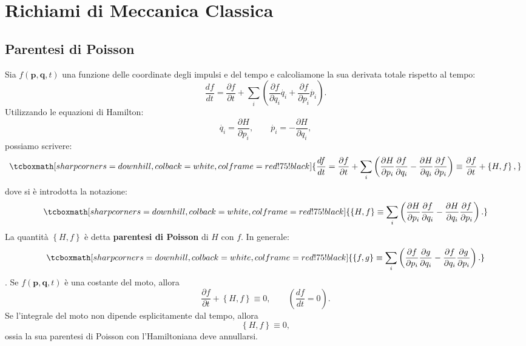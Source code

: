 \chapter{Richiami di Meccanica Classica}
\section[Parentesi di Poisson]{Parentesi di Poisson}
Sia $f(\mathbf{p},\mathbf{q},t)$ una funzione delle coordinate degli impulsi e del tempo e calcoliamone la sua derivata totale rispetto al tempo:
	\begin{equation}
		\frac{df}{dt}= \frac{\partial f}{\partial t} + \sum_i \left( \frac{\partial f}{\partial q_i} \dot {q_i} + \frac{\partial f}{\partial p_i} \dot {p_i} \right).
	\end{equation}
Utilizzando le equazioni di Hamilton:
	\begin{equation}
		\dot{q_i}=\frac{\partial H}{\partial p_i} , \qquad \dot{p_i}=-\frac{\partial H}{\partial q_i} ,
	\end{equation}
possiamo scrivere:
	\begin{equation}
		\tcboxmath[sharp corners=downhill ,colback=white,colframe=red!75!black]{
			\frac{df}{dt}=	\frac{\partial f}{\partial t} + \sum_i \left( \frac{\partial H}{\partial p_i}\frac{\partial f}{\partial q_i}-\frac{\partial H}{\partial q_i}\frac{\partial f}{\partial p_i}\right) \equiv \frac{\partial f}{\partial t} + \left\lbrace H,f \right\rbrace ,
				}
	\end{equation}
dove si \`e introdotta la notazione:
	\begin{equation}
		\tcboxmath[sharp corners=downhill ,colback=white,colframe=red!75!black]{
			\left\lbrace H,f \right\rbrace \equiv \sum_i \left(\frac{\partial H}{\partial p_i}\frac{\partial f}{\partial q_i}-\frac{\partial H}{\partial q_i}\frac{\partial f}{\partial p_i}\right)  .
			}
	\end{equation}
La quantit\`a $\left\lbrace H,f \right\rbrace$ è detta \textbf{parentesi di Poisson} di $H$ con $f$. In generale:
	\begin{equation}
		\tcboxmath[sharp corners=downhill ,colback=white,colframe=red!75!black]{
			\left\lbrace f,g \right\rbrace \equiv \sum_i \left(\frac{\partial f}{\partial p_i}\frac{\partial g}{\partial q_i}-\frac{\partial f}{\partial q_i}\frac{\partial g}{\partial p_i}\right)  .
			}
	\end{equation}.
Se $f(\mathbf{p},\mathbf{q},t)$ \`e una costante del moto, allora
	\begin{equation}
		\frac{\partial f}{\partial t}+\left\lbrace H,f \right\rbrace   \equiv 0 , \qquad
\left( \frac{df}{dt}=0 \right) .
	\end{equation}
Se l'integrale del moto non dipende esplicitamente dal tempo, allora
\begin{equation}
\left\lbrace H,f \right\rbrace  \equiv 0 ,
\end{equation}
ossia la sua parentesi di Poisson con l'Hamiltoniana deve annullarsi.\\

